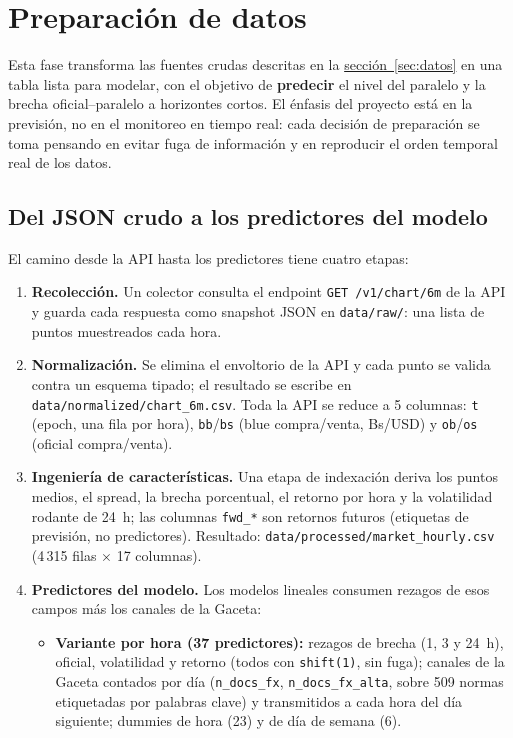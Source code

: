 \section{Preparación de datos}
\label{sec:preparacion}

Esta fase transforma las fuentes crudas descritas en la
\hyperref[sec:datos]{sección~\ref*{sec:datos}} en una tabla lista para
modelar, con el objetivo de \textbf{predecir} el nivel del paralelo y la
brecha oficial--paralelo a horizontes cortos. El énfasis del proyecto está en
la previsión, no en el monitoreo en tiempo real: cada decisión de
preparación se toma pensando en evitar fuga de información y en reproducir el
orden temporal real de los datos.

\subsection{Del JSON crudo a los predictores del modelo}

El camino desde la API hasta los predictores tiene cuatro etapas:

\begin{enumerate}
  \item \textbf{Recolección.} Un colector consulta el endpoint
        \texttt{GET /v1/chart/6m} de la API y guarda cada respuesta como
        snapshot JSON en \texttt{data/raw/}: una lista de puntos muestreados
        cada hora.
  \item \textbf{Normalización.} Se elimina el envoltorio de la API y cada
        punto se valida contra un esquema tipado; el resultado se escribe en
        \texttt{data/normalized/chart\_6m.csv}. Toda la API se reduce a
        5 columnas: \texttt{t} (epoch, una fila por hora), \texttt{bb}/\texttt{bs}
        (blue compra/venta, Bs/USD) y \texttt{ob}/\texttt{os} (oficial
        compra/venta).
  \item \textbf{Ingeniería de características.} Una etapa de indexación deriva
        los puntos medios, el spread, la brecha porcentual, el retorno por hora
        y la volatilidad rodante de 24~h; las columnas \texttt{fwd\_*} son
        retornos futuros (etiquetas de previsión, no predictores). Resultado:
        \texttt{data/processed/market\_hourly.csv} (4\,315 filas
        $\times$ 17 columnas).
  \item \textbf{Predictores del modelo.} Los modelos lineales consumen
        rezagos de esos campos más los canales de la Gaceta:
        \begin{itemize}
          \item \textbf{Variante por hora (37 predictores):} rezagos de brecha
                (1, 3 y 24~h), oficial, volatilidad y retorno (todos con
                \texttt{shift(1)}, sin fuga); canales de la Gaceta contados
                por día (\texttt{n\_docs\_fx}, \texttt{n\_docs\_fx\_alta},
                sobre 509 normas etiquetadas por palabras clave) y
                transmitidos a cada hora del día siguiente;
                dummies de hora (23) y de día de semana (6).
        \end{itemize}
\end{enumerate}

